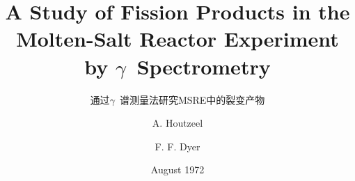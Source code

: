 \documentclass[12pt,a4paper]{scrreprt}
\begin{document}

\begin{CJK*}{UTF8}{gbsn}
\title{A Study of Fission Products in the Molten-Salt Reactor Experiment by $\gamma$\ Spectrometry}  %
\subtitle{通过$\gamma$\ 谱测量法研究MSRE中的裂变产物}
\author{A. Houtzeel \and F.  F. Dyer}      %
\date{August  1972}      %

\maketitle                   %
\renewcommand\abstractname{摘~要}

\renewcommand\contentsname{目~录}
\tableofcontents


\printindex

\end{CJK*}
\end{document}
